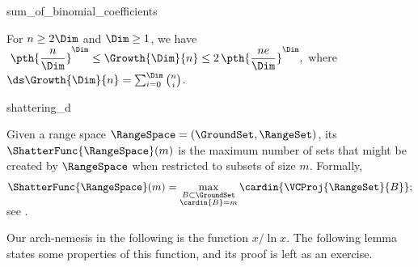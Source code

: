 
\providecommand{\LemmaGrowthImproved}{%
   For $n \geq 2\Dim$ and $\Dim \geq 1$, we have 
   \begin{math}
       \;\displaystyle%
       \pth{\frac{n }{\Dim}}^\Dim%
       \leq%
       \Growth{\Dim}{n}%
       \leq%
       2\, \pth{\frac{n e}{\Dim}}^\Dim,
   \end{math}
   where $\ds\Growth{\Dim}{n} = \sum_{i=0}^{\Dim} \binom{n}{i}$.}

\begin{fragment}{sum_of_binomial_coefficients}
    \providecommand{\LemmaGrowthImproved}{%
       For $n \geq 2\Dim$ and $\Dim \geq 1$, we have
       \begin{math}
           \;\displaystyle \pth{\frac{n }{\Dim}}^\Dim%
           \leq%
           \Growth{\Dim}{n}%
           \leq%
           2\; \pth{\frac{n e}{\Dim}}^\Dim,
       \end{math}
        where $\ds\Growth{\Dim}{n} =
       \sum_{i=0}^{\Dim} \binom{n}{i}$.}
    \begin{lemma}
        \LemmaGrowthImproved        
    \end{lemma}
\end{fragment}


\begin{fragment}{shattering_d}
    \begin{defn}
        Given a range space $\RangeSpace = (\GroundSet, \RangeSet)$,
        its  $\ShatterFunc{\RangeSpace}(m)$ is
        the maximum number of sets that might be created by
        $\RangeSpace$ when restricted to subsets of size
        $m$. Formally,
        \begin{equation*}
            \ShatterFunc{\RangeSpace}(m)%
            =%
            \smash{\max_{\substack{B \subset \GroundSet\\
                     \cardin{B} = m}} \cardin{ \VCProj{\RangeSet}{B} }};
        \end{equation*}
        see .
    \end{defn}
\end{fragment}



Our arch-nemesis in the following is the function $x / \ln x$. The
following lemma states some properties of this function, and its proof
is left as an exercise.


